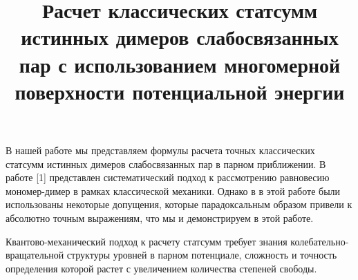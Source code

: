 \documentclass[14pt]{extarticle}
\begin{document}
\title{Расчет классических статсумм истинных димеров слабосвязанных пар с использованием многомерной поверхности потенциальной энергии}
\date{}
\maketitle

В нашей работе мы представляем формулы расчета точных классических статсумм истинных димеров слабосвязанных пар в парном приближении. В работе [1] представлен систематический подход к рассмотрению равновесию мономер-димер в рамках классической механики. Однако в в этой работе были использованы некоторые допущения, которые парадоксальным образом привели к абсолютно точным выражениям, что мы и демонстрируем в этой работе.   

Квантово-механический подход к расчету статсумм требует знания колебательно-вращательной структуры уровней в парном потенциале, сложность и точность определения которой растет с увеличением количества степеней свободы. 
\end{document}
